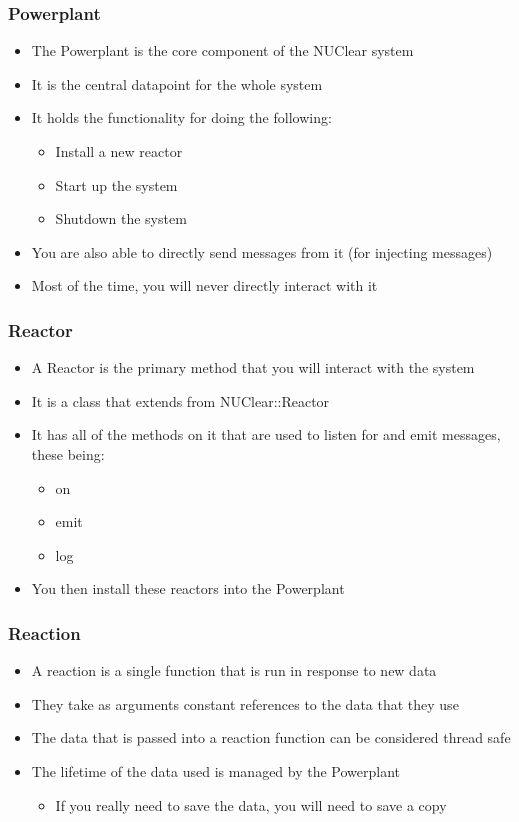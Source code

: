 \documentclass{beamer}
\begin{document}
\begin{frame}
	\frametitle{Powerplant}
	\begin{itemize}
		\item The Powerplant is the core component of the NUClear system
		\item It is the central datapoint for the whole system
		\item It holds the functionality for doing the following:
			\begin{itemize}
				\item Install a new reactor
				\item Start up the system
				\item Shutdown the system
			\end{itemize}
		\item You are also able to directly send messages from it (for injecting messages)
		\item Most of the time, you will never directly interact with it
	\end{itemize}
\end{frame}

\begin{frame}
	\frametitle{Reactor}
	\begin{itemize}
		\item A Reactor is the primary method that you will interact with the system
		\item It is a class that extends from NUClear::Reactor
		\item It has all of the methods on it that are used to listen for and emit messages, these being:
			\begin{itemize}
				\item on
				\item emit
				\item log
			\end{itemize}
		\item You then install these reactors into the Powerplant
	\end{itemize}
\end{frame}

\begin{frame}
	\frametitle{Reaction}
	\begin{itemize}
		\item A reaction is a single function that is run in response to new data
		\item They take as arguments constant references to the data that they use
		\item The data that is passed into a reaction function can be considered thread safe
		\item The lifetime of the data used is managed by the Powerplant 
			\begin{itemize}
				\item If you really need to save the data, you will need to save a copy
			\end{itemize}
	\end{itemize}
\end{frame}
\end{document}
